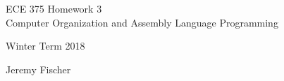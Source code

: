 \documentclass[12pt,letterpaper]{article}
\begin{document}
\begin{titlepage}
    \vspace*{4cm}
    \begin{flushright}
    {\huge
        ECE 375 Homework 3\\[1cm]
    }
    {\large
       Computer Organization and Assembly Language Programming
    }
    \end{flushright}
    \begin{flushleft}
    Winter Term 2018
    \end{flushleft}
    \begin{flushright}
    Jeremy Fischer

    \end{flushright}

\end{titlepage}
\end{document}
